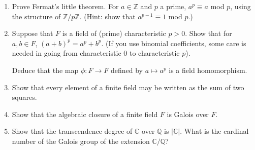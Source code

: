 \documentclass[12pt]{article}
\newcommand{\CC}{{\mathbb C}}
\newcommand{\QQ}{{\mathbb Q}}
\newcommand{\ZZ}{{\mathbb Z}}
\begin{document}
\begin{enumerate}


\item  Prove Fermat's little theorem.
  For $a\in\ZZ$ and $p$ a prime, $a^p\equiv a$ mod $p$, using the structure of $\ZZ/p\ZZ$.\newline
  (Hint: show that $a^{p-1}\equiv 1$  mod $p$.)
   \vspace{-2pt}

\item Suppose that $F$ is a field of (prime) characteristic $p>0$.
  Show that for $a,b\in F$, $(a+b)^p=a^p+b^p$. \newline
  (If you use binomial coefficients, some care is needed in
  going from characteristic 0 to characteristic $p$).

  Deduce that the map $\phi\colon F\to F$ defined by $a\mapsto a^p$ is a field homomorphism.
  
\vspace{-2pt}

\item  Show that every element of a finite field may be written as the sum of two squares.
   \vspace{-2pt}

\item  Show that the algebraic closure of a finite field $F$ is Galois over $F$.
   \vspace{-2pt}

 \item  Show that the transcendence degree of $\CC$ over $\QQ$ is $|\CC|$.
   What is the cardinal number of the Galois group of the extension $\CC/\QQ$?
   \vspace{-2pt}


\end{enumerate}
\end{document}
